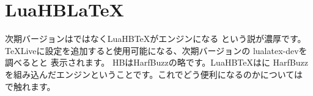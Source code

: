 \documentclass[main]{subfiles}
\begin{document}
\section{LuaHB\LaTeX{}}
次期バージョン\LuaLaTeX{}は\LuaTeX{}ではなくLuaHB\TeX{}がエンジンになる
という説が濃厚です。\TeX{}Liveに設定を追加すると使用可能になる、次期バージョンの
lualatex-devを調べるとと
表示されます。
HBはHarfBuzz\cite{harfbuzz}の略です。LuaHB\TeX{}は\LuaTeX{}に
HarfBuzzを組み込んだエンジンということです。これでどう便利になるのかについては
で触れます。
\end{document}
